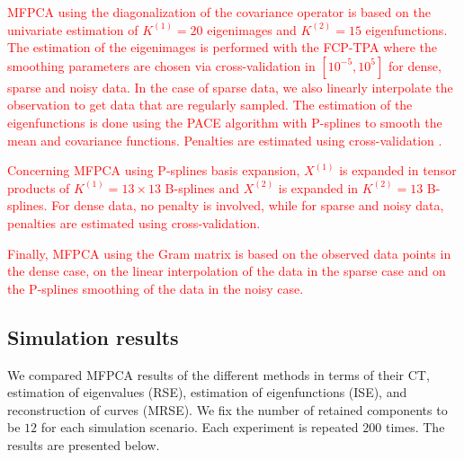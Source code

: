 \textcolor{red}{MFPCA using the diagonalization of the covariance operator is based on the univariate estimation of $K^{(1)} = 20$ eigenimages and $K^{(2)} = 15$ eigenfunctions. The estimation of the eigenimages is performed with the FCP-TPA where the smoothing parameters are chosen via cross-validation in $[10^{-5}, 10^5]$ for dense, sparse and noisy data. In the case of sparse data, we also linearly interpolate the observation to get data that are regularly sampled. The estimation of the eigenfunctions is done using the PACE algorithm \citep{yaoFunctionalDataAnalysis2005} with P-splines to smooth the mean and covariance functions. Penalties are estimated using cross-validation \citep{eilersFlexibleSmoothingBsplines1996}.}

\textcolor{red}{Concerning MFPCA using P-splines basis expansion, $X^{(1)}$ is expanded in tensor products of $K^{(1)} = 13 \times 13$ B-splines and $X^{(2)}$ is expanded in $K^{(2)} = 13$ B-splines. For dense data, no penalty is involved, while for sparse and noisy data, penalties are estimated using cross-validation.}

\textcolor{red}{Finally, MFPCA using the Gram matrix is based on the observed data points in the dense case, on the linear interpolation of the data in the sparse case \citep{benkoCommonFunctionalPrincipal2009} and on the P-splines smoothing of the data in the noisy case.}



\subsection{Simulation results} %
\label{sub:simulation_results}

We compared MFPCA results of the different methods in terms of their CT, estimation of eigenvalues (RSE), estimation of eigenfunctions (ISE), and reconstruction of curves (MRSE). We fix the number of retained components to be $12$ for each simulation scenario. Each experiment is repeated $200$ times. The results are presented below.

